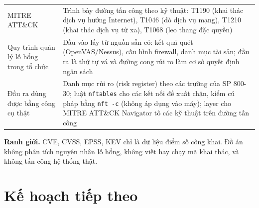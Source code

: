 \documentclass[11pt,a4paper]{article}
\begin{document}
\begin{center}
\begin{tabular}{@{}Y{4.6cm}Y{11.4cm}@{}}
MITRE ATT\&CK & Trình bày đường tấn công theo kỹ thuật: T1190 (khai thác dịch vụ hướng Internet), T1046 (dò dịch vụ mạng), T1210 (khai thác dịch vụ từ xa), T1068 (leo thang đặc quyền) \\
Quy trình quản lý lỗ hổng trong tổ chức & Đầu vào lấy từ nguồn sẵn có: kết quả quét (OpenVAS/Nessus), cấu hình firewall, danh mục tài sản; đầu ra là thứ tự vá và đường cong rủi ro làm cơ sở quyết định ngân sách \\
Đầu ra dùng được bằng công cụ thật & Danh mục rủi ro (risk register) theo các trường của SP 800-30; luật \texttt{nftables} cho các kết nối đề xuất chặn, kiểm cú pháp bằng \texttt{nft -c} (không áp dụng vào máy); layer cho MITRE ATT\&CK Navigator tô các kỹ thuật trên đường tấn công \\
\bottomrule
\end{tabular}
\end{center}

\textbf{Ranh giới.} CVE, CVSS, EPSS, KEV chỉ là dữ liệu điểm số công khai. Đồ án không phân tích nguyên nhân lỗ hổng, không viết hay chạy mã khai thác, và không tấn công hệ thống thật.

\section{Kế hoạch tiếp theo}
\end{document}
